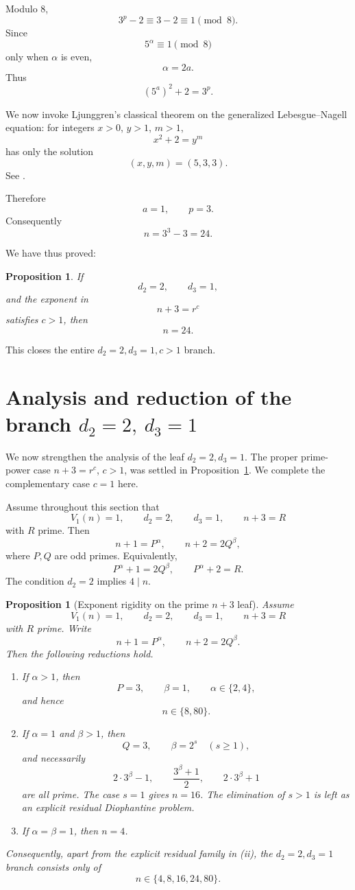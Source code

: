 \documentclass[11pt]{article}
\newtheorem{proposition}[theorem]{Proposition}
\begin{document}
Modulo \(8\),
\[
3^p-2\equiv3-2\equiv1\pmod8.
\]
Since
\[
5^\alpha\equiv1\pmod8
\]
only when \(\alpha\) is even,
\[
\alpha=2a.
\]
Thus
\[
(5^a)^2+2=3^p.
\]

We now invoke Ljunggren's classical theorem on the generalized
Lebesgue--Nagell equation: for integers \(x>0\), \(y>1\), \(m>1\),
\[
x^2+2=y^m
\]
has only the solution
\[
(x,y,m)=(5,3,3).
\]
See \cite{ljunggren1943}.

Therefore
\[
a=1,\qquad p=3.
\]
Consequently
\[
\boxed{n=3^3-3=24.}
\]

We have thus proved:

\begin{proposition}\label{prop:branchclosed}
If
\[
d_2=2,\qquad d_3=1,
\]
and the exponent in
\[
n+3=r^c
\]
satisfies \(c>1\), then
\[
\boxed{n=24.}
\]
\end{proposition}

This closes the entire \(d_2=2,d_3=1,c>1\) branch.

\section{Analysis and reduction of the branch $d_2=2,\ d_3=1$}

We now strengthen the analysis of the leaf $d_2=2,d_3=1$.  The proper
prime-power case $n+3=r^c$, $c>1$, was settled in
Proposition~\ref{prop:branchclosed}.  We complete the complementary case
$c=1$ here.

Assume throughout this section that
\[
V_1(n)=1,
\qquad d_2=2,
\qquad d_3=1,
\qquad n+3=R
\]
with $R$ prime.  Then
\[
n+1=P^\alpha,
\qquad
n+2=2Q^\beta,
\]
where $P,Q$ are odd primes.  Equivalently,
\[
\boxed{
P^\alpha+1=2Q^\beta,
\qquad
P^\alpha+2=R.
}
\tag{25}\label{eq:c1system}
\]
The condition $d_2=2$ implies $4\mid n$.

\begin{proposition}[Exponent rigidity on the prime $n+3$ leaf]
\label{prop:primeleaf}
Assume
\[
V_1(n)=1,
\qquad d_2=2,
\qquad d_3=1,
\qquad n+3=R
\]
with $R$ prime.  Write
\[
n+1=P^\alpha,
\qquad
n+2=2Q^\beta.
\]
Then the following reductions hold.
\begin{enumerate}[label=(\roman*)]
    \item If $\alpha>1$, then
    \[
    P=3,
    \qquad \beta=1,
    \qquad \alpha\in\{2,4\},
    \]
    and hence
    \[
    n\in\{8,80\}.
    \]
    \item If $\alpha=1$ and $\beta>1$, then
    \[
    Q=3,
    \qquad \beta=2^s\quad(s\geq1),
    \]
    and necessarily
    \[
    2\cdot3^\beta-1,
    \qquad
    \frac{3^\beta+1}{2},
    \qquad
    2\cdot3^\beta+1
    \]
    are all prime.  The case $s=1$ gives $n=16$.
    The elimination of $s>1$ is left as an explicit residual Diophantine
    problem.
    \item If $\alpha=\beta=1$, then $n=4$.
\end{enumerate}
Consequently, apart from the explicit residual family in (ii), the
$d_2=2,d_3=1$ branch consists only of
\[
\boxed{n\in\{4,8,16,24,80\}}.
\]
\end{proposition}
\end{document}
